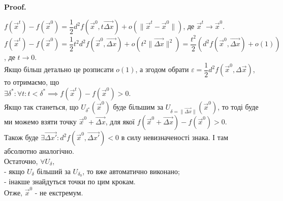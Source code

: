 \documentclass[a4paper, 10pt]{article}
\makeatletter
\def\qed{$\blacksquare$}
\theoremstyle{theoremdd}
\theoremstyle{theoremdd}
\theoremstyle{theoremdd}
\theoremstyle{theoremdd}
\theoremstyle{theoremdd}
\theoremstyle{theoremdd}
\theoremstyle{theoremdd}
\theoremstyle{theoremdd}
\theoremstyle{theoremdd}
\renewenvironment{proof}[1][Proof.\\]{\par
\pushQED{\hfill \qed}%
\normalfont \topsep6\p@\@plus6\p@\relax
\trivlist
\item\relax
{\bfseries
#1\@addpunct{.}}\hspace\labelsep\ignorespaces
}{%
\popQED\endtrivlist\@endpefalse
}
\newcommand\Norm[1]{\|#1\|}
\makeatother
\begin{document}
\begin{proof}
$f(\vec{x}^t) - f(\vec{x}^0) = \dfrac{1}{2} d^2f (\vec{x}^0, t \vec{\Delta x}) + o(\Norm{\vec{x}^t - \vec{x}^0})$, де $\vec{x}^t \to \vec{x}^0$.\\
$f(\vec{x}^t) - f(\vec{x}^0) = \dfrac{1}{2} t^2 d^2 f(\vec{x}^0, \vec{\Delta x}) + o(t^2 \Norm{\vec{\Delta x}}^2) = \dfrac{t^2}{2} \left(d^2 f(\vec{x}^0, \vec{\Delta x}) + o(1) \right)$, де $t \to 0$.\\
Якщо більш детально це розписати $o(1)$, а згодом обрати $\varepsilon = \dfrac{1}{2}d^2f(\vec{x}^0,\Delta \vec{x})$, то отримаємо, що\\
$\exists \delta^*: \forall t: t < \delta^* \implies f(\vec{x}^t) - f(\vec{x}^0) > 0$.\\
Якщо так станеться, що $U_{\delta^*}(\vec{x}^0)$ буде більшим за $U_{\delta = \Norm{\vec{\Delta x}}}(\vec{x}^0)$, то тоді буде ми можемо взяти точку $\vec{x}^0 + \vec{\Delta x}$, для якої $f(\vec{x}^0 + \vec{\Delta x}) - f(\vec{x}^0) > 0$.\\
Також буде $\exists \vec{\Delta x'}: d^2 f(\vec{x}^0, \vec{\Delta x'}) < 0$ в силу невизначеності знака. І там абсолютно аналогічно.\\
Остаточно, $\forall U_{\delta}$,\\
- якщо $U_{\delta}$ більший за $U_{\delta_0}$, то вже автоматично виконано;\\
- інакше знайдуться точки по цим крокам.\\
Отже, $\vec{x}^0$ - не екстремум.
\end{proof}
\end{document}
